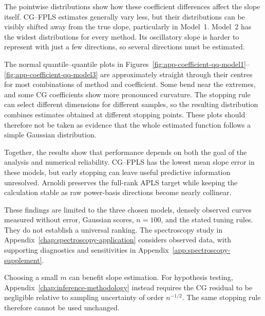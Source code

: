 The pointwise distributions show how these coefficient differences affect
the slope itself.  CG--FPLS estimates generally vary less, but their
distributions can be visibly shifted away from the true slope,
particularly in Model~1.  Model~2 has the widest distributions for every
method.  Its oscillatory slope is harder to represent with just a few
directions, so several directions must be estimated.

The normal quantile--quantile plots in
Figures~\ref{fig:app-coefficient-qq-model1}--
\ref{fig:app-coefficient-qq-model3} are approximately straight through
their centres for most combinations of method and coefficient.  Some bend
near the extremes, and some CG coefficients show more pronounced curvature.
The stopping rule can select different dimensions for different samples,
so the resulting distribution combines estimates obtained at different
stopping points.  These plots should therefore not be taken as evidence
that the whole estimated function follows a simple Gaussian distribution.

Together, the results show that performance depends on both the goal of the
analysis and numerical reliability. CG--FPLS has the lowest mean slope error
in these models, but early stopping can leave useful predictive information
unresolved. Arnoldi preserves the full-rank APLS target while keeping the
calculation stable as raw power-basis directions become nearly collinear.

These findings are limited to the three chosen models, densely observed
curves measured without error, Gaussian scores, $n=100$, and the stated tuning
rules. They do not establish a universal ranking. The spectroscopy study in
Appendix~\ref{chap:spectroscopy-application} considers observed data, with
supporting diagnostics and sensitivities in
Appendix~\ref{app:spectroscopy-supplement}.

Choosing a small $m$ can benefit slope estimation. For hypothesis testing,
Appendix~\ref{chap:inference-methodology} instead requires the CG residual
to be negligible relative to sampling uncertainty of order $n^{-1/2}$.
The same stopping rule therefore cannot be used unchanged.
